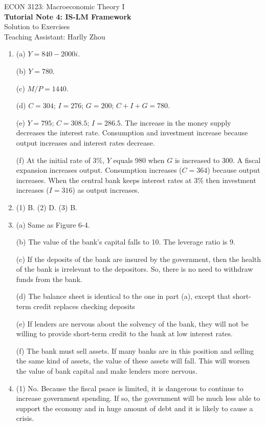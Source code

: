 \documentclass[12pt]{article}
\begin{document}
\begin{center}
    ECON 3123: Macroeconomic Theory I\\
    {\large \textbf{Tutorial Note 4: IS-LM Framework}}\\
    Solution to Exercises\\
    Teaching Assistant: Harlly Zhou
\end{center}

\begin{enumerate}[label=\arabic*.]
    \item (a) $Y = 840 - 2000 i$.
    
    (b) $Y = 780$.

    (c) $M/P = 1440$.

    (d) $C=304$; $I=276$; $G=200$; $C+I+G=780$.

    (e) $Y = 795$; $C =308.5$; $I = 286.5$. The increase in the money supply decreases the interest rate. Consumption and investment increase because output increases and interest rates decrease.

    (f) At the initial rate of 3\%, $Y$ equals 980 when $G$ is increased to 300. A fiscal expansion increases output. Consumption increases ($C = 364$) because output increases. When the central bank keeps interest rates at 3\% then investment increases ($I = 316$) as output increases.
    \item (1) B. (2) D. (3) B.
    \item (a) Same as Figure 6-4.
    
    (b) The value of the bank's capital falls to 10. The leverage ratio is 9.
    
    (c) If the deposits of the bank are insured by the government, then the health of the bank is irrelevant to the depositors. So, there is no need to withdraw funds from the bank.
    
    (d) The balance sheet is identical to the one in part (a), except that short-term credit replaces checking deposits
    
    (e) If lenders are nervous about the solvency of the bank, they will not be willing to provide short-term credit to the bank at low interest rates.
    
    (f) The bank must sell assets. If many banks are in this position and selling the same kind of assets, the value of these assets will fall. This will worsen the value of bank capital and make lenders more nervous.
    \item (1) No. Because the fiscal psace is limited, it is dangerous to continue to increase government spending. If so, the government will be much less able to support the economy and
    in huge amount of debt and it is likely to cause a crisis.
    

\end{enumerate}
\end{document}
